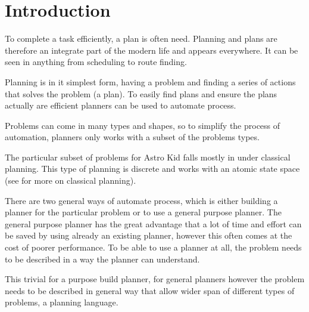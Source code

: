 \chapter{Introduction}	
	

	To complete a task efficiently, a plan is often need. Planning and plans are therefore an integrate part of the modern life and appears everywhere. It can be seen in anything from scheduling to route finding. 

	Planning is in it simplest form, having a problem and finding a series of actions that solves the problem (a plan). To easily find plans and ensure the plans actually are efficient planners can be used to automate process.  
	
	Problems can come in many types and shapes, so to simplify the process of automation, planners only works with a subset of the problems types. 

	The particular subset of problems for Astro Kid falls mostly in under classical planning. This type of planning is discrete and works with an atomic state space (see \cite{russell2014a} for more on classical planning).
	
	

	There are two general ways of automate process, which is either building a planner for the particular problem or to use a general purpose planner. 
	The general purpose planner has the great advantage that a lot of time and effort can be saved by using already an existing planner, however this often comes at the cost of poorer performance.
	To be able to use a planner at all, the problem needs to be described in a way the planner can understand. 

	This trivial for a purpose build planner, for general planners however the problem needs to be described in general way that allow wider span of different types of problems, a planning language. 

